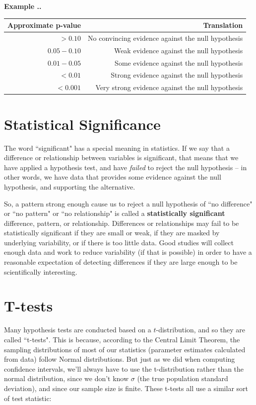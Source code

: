 \documentclass[twoside]{book}\usepackage[]{graphicx}\usepackage[]{xcolor}
\def\term#1{\textbf{#1}}
\newcounter{example}[section]
\newenvironment{example}%
{\refstepcounter{example}%
\textbf{Example \thesection.\arabic{example}. }}%
{}
\begin{document}
\begin{example}
\begin{center}
\begin{tabular}{r|r}
Approximate p-value & Translation\\
\hline
$> 0.10$ & No convincing evidence against the null hypothesis\\
$0.05-0.10$ & Weak evidence against the null hypothesis\\
$0.01-0.05$ & Some evidence against the null hypothesis\\
$<0.01$ & Strong evidence against the null hypothesis\\
$<0.001$ & Very strong evidence against the null hypothesis\\
\hline
\end{tabular}
\end{center}

\end{example}

\section{Statistical Significance}
The word ``significant" has a special meaning in statistics.  If we say that a difference or relationship between variables is significant, that means that we have applied a hypothesis test, and have \emph{failed} to reject the null hypothesis -- in other words, we have data that provides some evidence against the null hypothesis, and supporting the alternative.

So, a pattern strong enough cause us to reject a null hypothesis of ``no difference" or ``no pattern" or ``no relationship" is called a \term{statistically significant} difference, pattern, or relationship.  Differences or relationships may fail to be statistically
significant if they are small or weak, if they are masked by underlying variability, or if there is too 
little data.  Good studies will collect enough data and work to reduce variability (if that is possible)
in order to have a reasonable expectation of detecting differences if they are large enough to 
be scientifically interesting.

\section{T-tests}


Many hypothesis tests are conducted based on a $t$-distribution, and so they are called ``t-tests". This is because, according to the Central Limit Theorem, the sampling distributions of most of our statistics (parameter estimates calculated from data) follow Normal distributions.  But just as we did when computing confidence intervals, we'll always have to use the t-distribution rather than the normal distribution, since we don't know $\sigma$ (the true population standard deviation), and since our sample size is finite.   These t-tests all use a similar sort
of test statistic:
\end{document}
